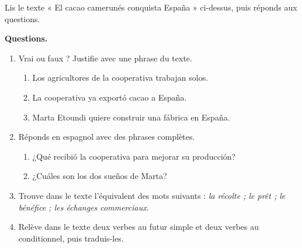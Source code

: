 \documentclass[11pt]{article}
\begin{document}
\begin{exercice}
Lis le texte « El cacao camerunés conquista España » ci-dessus, puis réponds aux questions.

\textbf{Questions.}
\begin{enumerate}
\item Vrai ou faux ? Justifie avec une phrase du texte.
\begin{enumerate}
\item Los agricultores de la cooperativa trabajan solos.
\item La cooperativa ya exportó cacao a España.
\item Marta Etoundi quiere construir una fábrica en España.
\end{enumerate}
\item Réponds en espagnol avec des phrases complètes.
\begin{enumerate}
\item ¿Qué recibió la cooperativa para mejorar su producción?
\item ¿Cuáles son los dos sueños de Marta?
\end{enumerate}
\item Trouve dans le texte l'équivalent des mots suivants : \emph{la récolte ; le prêt ; le bénéfice ; les échanges commerciaux}.
\item Relève dans le texte deux verbes au futur simple et deux verbes au conditionnel, puis traduis-les.
\end{enumerate}
\end{exercice}
\end{document}
